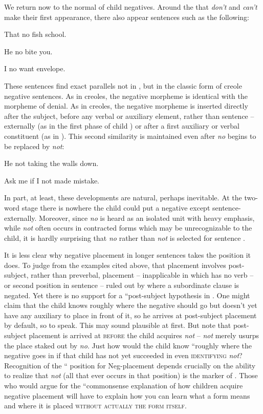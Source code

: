 We return now to the normal  of child negatives. Around the  that \textit{don't} and \textit{can't} make their first appearance, there also appear sentences such as the following:

\ea\label{ex:3:58}
 That no fish school. 
\z

\ea\label{ex:3:59}
 He no bite you. 
\z

\ea\label{ex:3:60}
 I no want envelope. 
\z

These sentences find exact parallels not in , but in the classic form of creole negative sentences. As in creoles, the negative morpheme is identical with the morpheme of denial. As in creoles, the negative morpheme is inserted directly after the subject, before any verbal or auxiliary element, rather than sentence -- externally (as in the first phase of child ) or after a first auxiliary or verbal constituent (as in ). This second similarity is maintained even after \textit{no} begins to be replaced by \textit{not}:

\ea\label{ex:3:61}
 He not taking the walls down.
\z

\ea\label{ex:3:62}
 Ask me if I not made mistake.
\z

In part, at least, these developments are natural, perhaps inevitable. At the two-word stage there is nowhere the child could put a negative except sentence-externally. Moreover, since \textit{no} is heard as an isolated unit with heavy emphasis, while \textit{not} often occurs in contracted forms which may be unrecognizable to the child, it is hardly surprising that \textit{no} rather than \textit{not} is selected for sentence .

It is less clear why negative placement in longer sentences takes the position it does. To judge from the examples cited above, that placement involves post-subject, rather than preverbal, placement -- inapplicable in  which has no verb -- or second position in sentence -- ruled out by  where a subordinate clause is negated. Yet there is no support for a ``post-subject hypothesis in . One might claim that the child knows roughly where the negative should go but doesn't yet have any auxiliary to place in front of it, so he arrives at post-subject placement by default, so to speak. This may sound plausible at first. But note that post-subject placement is arrived at \textsc{before} the child acquires \textit{not} -- \textit{not} merely usurps the place staked out by \textit{no}. Just how would the child know ``roughly where the negative goes in  if that child has not yet succeeded in even \textsc{identifying} \textit{not}? Recognition of the `` position for Neg-placement depends crucially on the ability to realize that \textit{not} (all that ever occurs in that position) is the marker of . Those who would argue for the ``commonsense explanation of how children acquire negative placement will have to explain how you can learn what a form means and where it is placed \textsc{without actually  the form itself}.

